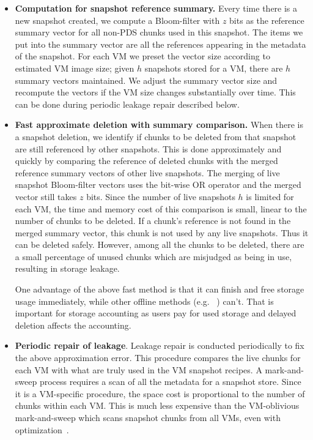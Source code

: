 \begin{itemize}
\item {\bf Computation for snapshot reference summary.}
Every time there is a new snapshot created,
we compute a Bloom-filter with $z$ bits as the reference summary vector for all non-PDS chunks used 
in this snapshot.
The items we put into the summary vector are all the references appearing in the metadata of the snapshot.
For each VM we preset the vector size according to estimated VM image size;
given $h$ snapshots stored for a VM, there are $h$ summary vectors maintained.
We adjust the summary vector size and recompute the vectors if the VM size changes substantially over time.
This can be done during periodic leakage repair described below.

\item {\bf Fast approximate deletion with summary comparison.}
When there is a snapshot deletion,  
we identify if chunks to be deleted from that snapshot
are still referenced by other snapshots. 
This is done approximately and quickly by comparing the 
reference of deleted chunks  with
the merged reference summary vectors of other live snapshots.
The merging of live snapshot Bloom-filter vectors uses the bit-wise OR operator 
and the merged vector still takes $z$ bits.
Since the number of live snapshots $h$ is limited for
each VM, 
the time and memory cost of this comparison is small, linear to the number of chunks to be deleted.
If a chunk's reference is not found in the merged summary vector, 
this chunk is not used by any live snapshots. Thus it can be deleted safely.
However, among all the chunks to be deleted, 
there are a small percentage of unused chunks  which
are misjudged as  being in use, resulting in storage leakage.

One advantage of the above fast method is that it can finish  and free storage 
usage immediately, while other offline methods (e.g. ~\cite{Guo2011,Fabiano2013})
can't. That is important for storage accounting as users pay for used storage and delayed deletion
affects the accounting.

\item {\bf Periodic repair of leakage}.
Leakage repair is conducted periodically to fix the above approximation error.
This procedure compares the live chunks for each VM with what are truly used in the VM snapshot recipes.
A mark-and-sweep process  requires a scan of all the metadata for a snapshot store.
Since it is a VM-specific procedure, 
the space cost is proportional to the number of chunks
within each VM. 
 This is  much less expensive  than  the VM-oblivious mark-and-sweep
which scans snapshot chunks from all VMs, even with optimization~\cite{Guo2011}.


\end{itemize}
